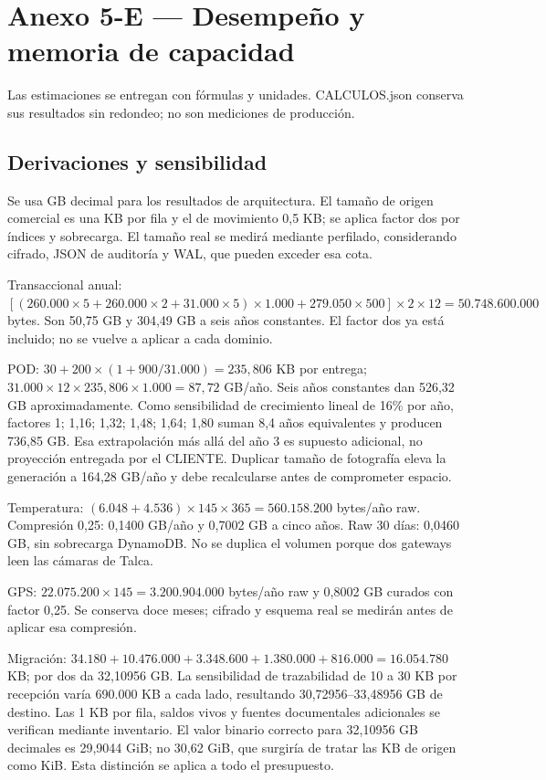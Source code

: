 \chapter*{Anexo 5-E --- Desempeño y memoria de capacidad}
\label{anx:5-E}
Las estimaciones se entregan con fórmulas y unidades. CALCULOS.json conserva sus resultados sin redondeo; no son mediciones de producción.

\section*{Derivaciones y sensibilidad}
Se usa GB decimal para los resultados de arquitectura. El tamaño de origen comercial es una KB por fila y el de movimiento 0,5 KB; se aplica factor dos por índices y sobrecarga. El tamaño real se medirá mediante perfilado, considerando cifrado, JSON de auditoría y WAL, que pueden exceder esa cota.

Transaccional anual: $[(260.000\times5+260.000\times2+31.000\times5)\times1.000+279.050\times500]\times2\times12 = 50.748.600.000$ bytes. Son 50,75 GB y 304,49 GB a seis años constantes. El factor dos ya está incluido; no se vuelve a aplicar a cada dominio.

POD: $30+200\times(1+900/31.000)=235,806$ KB por entrega; $31.000\times12\times235,806\times1.000=87,72$ GB/año. Seis años constantes dan 526,32 GB aproximadamente. Como sensibilidad de crecimiento lineal de 16\% por año, factores 1; 1,16; 1,32; 1,48; 1,64; 1,80 suman 8,4 años equivalentes y producen 736,85 GB. Esa extrapolación más allá del año 3 es supuesto adicional, no proyección entregada por el CLIENTE. Duplicar tamaño de fotografía eleva la generación a 164,28 GB/año y debe recalcularse antes de comprometer espacio.

Temperatura: $(6.048+4.536)\times145\times365=560.158.200$ bytes/año raw. Compresión 0,25: 0,1400 GB/año y 0,7002 GB a cinco años. Raw 30 días: 0,0460 GB, sin sobrecarga DynamoDB. No se duplica el volumen porque dos gateways leen las cámaras de Talca.

GPS: $22.075.200\times145=3.200.904.000$ bytes/año raw y 0,8002 GB curados con factor 0,25. Se conserva doce meses; cifrado y esquema real se medirán antes de aplicar esa compresión.

Migración: $34.180+10.476.000+3.348.600+1.380.000+816.000=16.054.780$ KB; por dos da 32,10956 GB. La sensibilidad de trazabilidad de 10 a 30 KB por recepción varía 690.000 KB a cada lado, resultando 30,72956--33,48956 GB de destino. Las 1 KB por fila, saldos vivos y fuentes documentales adicionales se verifican mediante inventario. El valor binario correcto para 32,10956 GB decimales es 29,9044 GiB; no 30,62 GiB, que surgiría de tratar las KB de origen como KiB. Esta distinción se aplica a todo el presupuesto.


